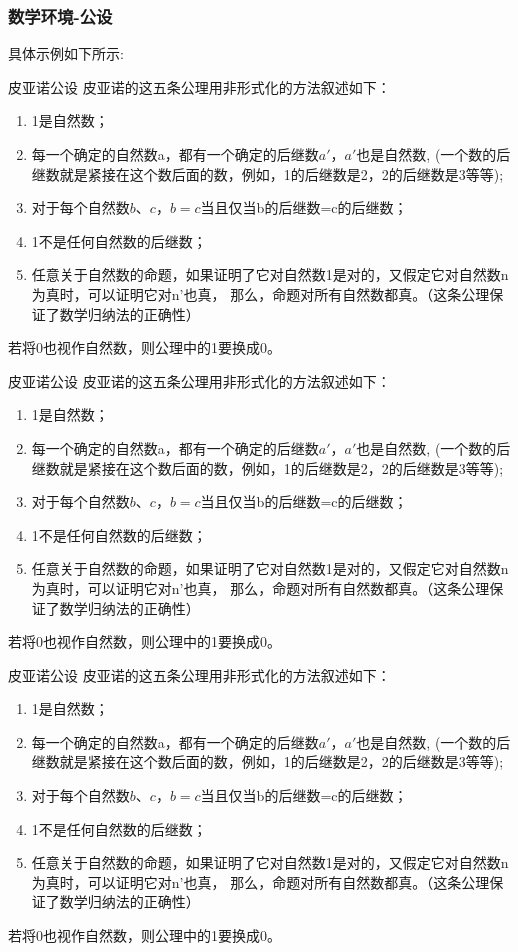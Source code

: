 \subsubsection{数学环境-公设}
具体示例如下所示:
\begin{tcblisting}{}
\begin{postulate}{皮亚诺公设}
皮亚诺的这五条公理用非形式化的方法叙述如下：
\begin{enumerate}
\item 1是自然数；
\item 每一个确定的自然数a，都有一个确定的后继数$a'$，$a'$也是自然数, 
(一个数的后继数就是紧接在这个数后面的数，例如，1的后继数是2，2的后继数是3等等);
\item 对于每个自然数$b、c，b=c$当且仅当b的后继数=c的后继数；
\item 1不是任何自然数的后继数；
\item 任意关于自然数的命题，如果证明了它对自然数1是对的，又假定它对自然数n为真时，可以证明它对n'也真， 
那么，命题对所有自然数都真。（这条公理保证了数学归纳法的正确性）
\end{enumerate}
若将0也视作自然数，则公理中的1要换成0。
\end{postulate}
\end{tcblisting}
\begin{postulate}{皮亚诺公设}      
    皮亚诺的这五条公理用非形式化的方法叙述如下：
    \begin{enumerate}
        \item 1是自然数；
        \item 每一个确定的自然数a，都有一个确定的后继数$a'$，$a'$也是自然数, 
        (一个数的后继数就是紧接在这个数后面的数，例如，1的后继数是2，2的后继数是3等等);
        \item 对于每个自然数$b、c，b=c$当且仅当b的后继数=c的后继数；
        \item 1不是任何自然数的后继数；
        \item 任意关于自然数的命题，如果证明了它对自然数1是对的，又假定它对自然数n为真时，可以证明它对n'也真， 
        那么，命题对所有自然数都真。（这条公理保证了数学归纳法的正确性）
    \end{enumerate}
    若将0也视作自然数，则公理中的1要换成0。
\end{postulate}

\begin{postulate*}{皮亚诺公设}      
皮亚诺的这五条公理用非形式化的方法叙述如下：
\begin{enumerate}
    \item 1是自然数；
    \item 每一个确定的自然数a，都有一个确定的后继数$a'$，$a'$也是自然数, 
    (一个数的后继数就是紧接在这个数后面的数，例如，1的后继数是2，2的后继数是3等等);
    \item 对于每个自然数$b、c，b=c$当且仅当b的后继数=c的后继数；
    \item 1不是任何自然数的后继数；
    \item 任意关于自然数的命题，如果证明了它对自然数1是对的，又假定它对自然数n为真时，可以证明它对n'也真， 
    那么，命题对所有自然数都真。（这条公理保证了数学归纳法的正确性）
\end{enumerate}
若将0也视作自然数，则公理中的1要换成0。
\end{postulate*}


